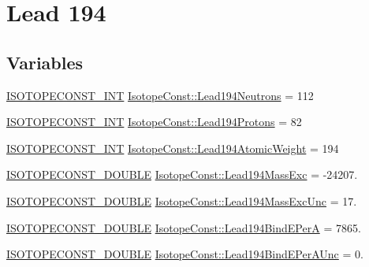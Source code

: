 \hypertarget{group___isotope_const-_lead-_pb194}{}\section{Lead 194}
\label{group___isotope_const-_lead-_pb194}
\subsection*{Variables}
\begin{DoxyCompactItemize}
\item 
\mbox{\hyperlink{group___isotope_const-_macros_ga5f18360b3e99483a35c32d789e62621c}{I\+S\+O\+T\+O\+P\+E\+C\+O\+N\+S\+T\+\_\+\+I\+NT}} \mbox{\hyperlink{group___isotope_const-_lead-_pb194_ga1f6706ac77e3d8990d8300ca85de3000}{Isotope\+Const\+::\+Lead194\+Neutrons}} = 112
\item 
\mbox{\hyperlink{group___isotope_const-_macros_ga5f18360b3e99483a35c32d789e62621c}{I\+S\+O\+T\+O\+P\+E\+C\+O\+N\+S\+T\+\_\+\+I\+NT}} \mbox{\hyperlink{group___isotope_const-_lead-_pb194_gae556843e1595705a9c5ade2f210dc094}{Isotope\+Const\+::\+Lead194\+Protons}} = 82
\item 
\mbox{\hyperlink{group___isotope_const-_macros_ga5f18360b3e99483a35c32d789e62621c}{I\+S\+O\+T\+O\+P\+E\+C\+O\+N\+S\+T\+\_\+\+I\+NT}} \mbox{\hyperlink{group___isotope_const-_lead-_pb194_gafec8587a3529e940827c1e682a13d2f1}{Isotope\+Const\+::\+Lead194\+Atomic\+Weight}} = 194
\item 
\mbox{\hyperlink{group___isotope_const-_macros_ga8f45a7272ce02c0b4c65c44636ed719a}{I\+S\+O\+T\+O\+P\+E\+C\+O\+N\+S\+T\+\_\+\+D\+O\+U\+B\+LE}} \mbox{\hyperlink{group___isotope_const-_lead-_pb194_ga8a79d18c6639a99259895220f7e502f4}{Isotope\+Const\+::\+Lead194\+Mass\+Exc}} = -\/24207.
\item 
\mbox{\hyperlink{group___isotope_const-_macros_ga8f45a7272ce02c0b4c65c44636ed719a}{I\+S\+O\+T\+O\+P\+E\+C\+O\+N\+S\+T\+\_\+\+D\+O\+U\+B\+LE}} \mbox{\hyperlink{group___isotope_const-_lead-_pb194_ga42d184421df9e486c3bcaac4958a89f1}{Isotope\+Const\+::\+Lead194\+Mass\+Exc\+Unc}} = 17.
\item 
\mbox{\hyperlink{group___isotope_const-_macros_ga8f45a7272ce02c0b4c65c44636ed719a}{I\+S\+O\+T\+O\+P\+E\+C\+O\+N\+S\+T\+\_\+\+D\+O\+U\+B\+LE}} \mbox{\hyperlink{group___isotope_const-_lead-_pb194_gabbd647516c062c37589f200d47642aba}{Isotope\+Const\+::\+Lead194\+Bind\+E\+PerA}} = 7865.
\item 
\mbox{\hyperlink{group___isotope_const-_macros_ga8f45a7272ce02c0b4c65c44636ed719a}{I\+S\+O\+T\+O\+P\+E\+C\+O\+N\+S\+T\+\_\+\+D\+O\+U\+B\+LE}} \mbox{\hyperlink{group___isotope_const-_lead-_pb194_ga172cbac03b013617d1c65d1f642fa620}{Isotope\+Const\+::\+Lead194\+Bind\+E\+Per\+A\+Unc}} = 0.

\end{DoxyCompactItemize}
